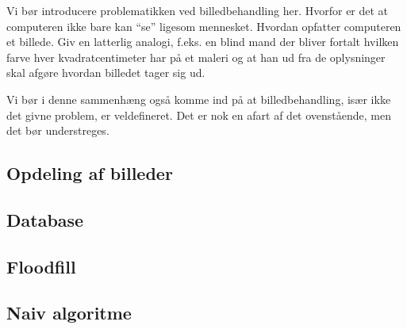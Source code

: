 {
{\sffamily Vi bør introducere problematikken ved billedbehandling her.
Hvorfor er det at computeren ikke bare kan ``se'' ligesom mennesket.
Hvordan opfatter computeren et billede. Giv en latterlig analogi, f.eks.
en blind mand der bliver fortalt hvilken farve hver kvadratcentimeter
har på et maleri og at han ud fra de oplysninger skal afgøre hvordan
billedet tager sig ud.

Vi bør i denne sammenhæng også komme ind på at billedbehandling, især
ikke det givne problem, er veldefineret. Det er nok en afart af det
ovenstående, men det bør understreges.
}

\subsection{Opdeling af billeder}


\subsection{Database}


\subsection{Floodfill}


\subsection{Naiv algoritme}


}

